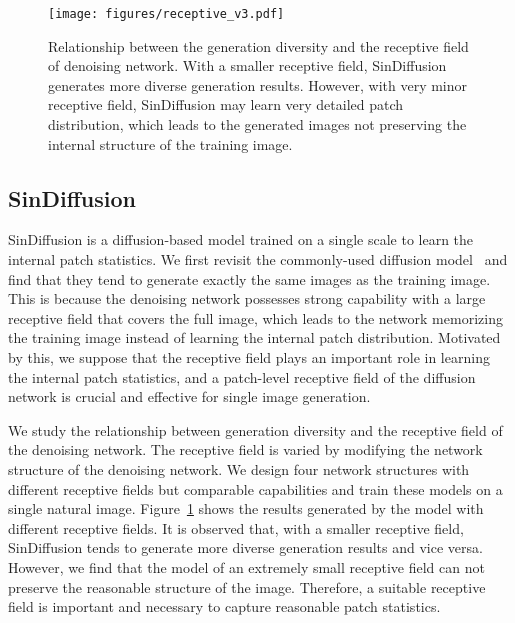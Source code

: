 \documentclass[10pt,twocolumn,letterpaper]{article}
\begin{document}
\begin{figure}[t]
  \centering
   \texttt{[image: figures/receptive\_v3.pdf]}
   \vspace{-4mm}
   \caption{
   Relationship between the generation diversity and the receptive field of denoising network.
   With a smaller receptive field, SinDiffusion generates more diverse generation results.
   However, with very minor receptive field, SinDiffusion may learn very detailed patch distribution, which leads to the generated images not preserving the internal structure of the training image.
   }
   \vspace{-4mm}
   \label{fig:receptive}
\end{figure}

\subsection{SinDiffusion}
\label{sec:sindiffusion}

SinDiffusion is a diffusion-based model trained on a single scale to learn the internal patch statistics.
We first revisit the commonly-used diffusion model~\cite{dhariwal2021diffusion} and find that they tend to generate exactly the same images as the training image.
This is because the denoising network possesses strong capability with a large receptive field that covers the full image, which leads to the network memorizing the training image instead of learning the internal patch distribution.
Motivated by this, we suppose that the receptive field plays an important role in learning the internal patch statistics, and a patch-level receptive field of the diffusion network is crucial and effective for single image generation.

We study the relationship between generation diversity and the receptive field of the denoising network.
The receptive field is varied by modifying the network structure of the denoising network.
We design four network structures with different receptive fields but comparable capabilities and train these models on a single natural image.
Figure~\ref{fig:receptive} shows the results generated by the model with different receptive fields.
It is observed that, with a smaller receptive field, SinDiffusion tends to generate more diverse generation results and vice versa.
However, we find that the model of an extremely small receptive field can not preserve the reasonable structure of the image.
Therefore, a suitable receptive field is important and necessary to capture reasonable patch statistics.
\end{document}
